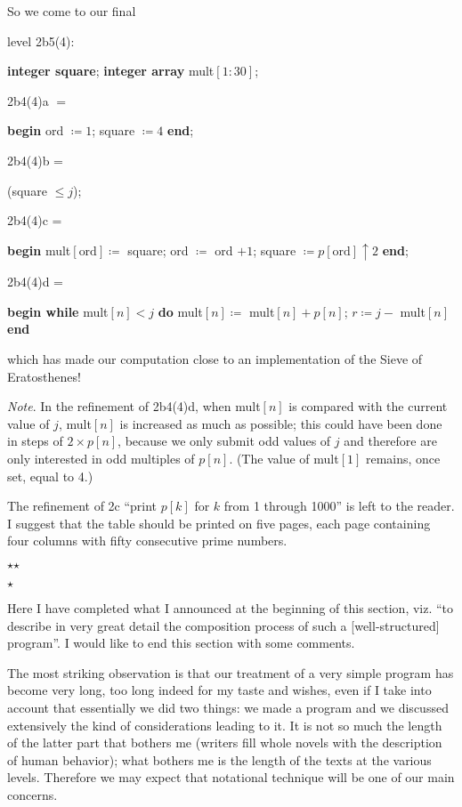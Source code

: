 So we come to our final

\noindent
level 2b5(4):

\noindent
\textbf{integer square}; \textbf{integer array} mult$[1 : 30]$;

\noindent
2b4(4)a $=$

\noindent
\textbf{begin} ord $\coloneq 1$; square $\coloneq 4$ \textbf{end};

\noindent
2b4(4)b =

\noindent
\quad (square $\leqslant j$);

\noindent
2b4(4)c =

\noindent
\textbf{begin} mult$[\text{ord}] \coloneq$ square; ord $\coloneq$ ord $ + 1$; square $\coloneq p[\text{ord}] \uparrow 2$ \textbf{end};

\noindent
2b4(4)d =

\noindent
\textbf{begin while} mult$[n] < j$ \textbf{do} mult$[n]\coloneq$ mult$[n] + p[n]$; $r\coloneq j -$ mult$[n]$ \textbf{end}

\noindent
which has made our computation close to an implementation of the Sieve of Eratosthenes!

\noindent
\textit{Note}. In the refinement of 2b4(4)d, when mult$[n]$ is compared with the current value of $j$, mult$[n]$ is increased as much as possible; this could have been done in steps of $2\times p[n]$, because we only submit odd values of $j$ and therefore are only interested in odd multiples of $p[n]$. (The value of mult$[1]$ remains, once set, equal to 4.)

The refinement of 2c ``print $p[k]$ for $k$ from 1 through 1000'' is left to the reader. I suggest that the table should be printed on five pages, each page containing four columns with fifty consecutive prime numbers.

\vspace*{-1em}
\begin{center}
	$\star$\quad\quad  $\star$\\
	\nopagebreak
	
	\vspace*{-.5em}
	$\star$
\end{center}
\vspace*{-1em}

Here I have completed what I announced at the beginning of this section, viz. ``to describe in very great detail the composition process of such a [well-structured] program''. I would like to end this section with some comments.

The most striking observation is that our treatment of a very simple program has become very long, too long indeed for my taste and wishes, even if I take into account that essentially we did two things: we made a program and we discussed extensively the kind of considerations leading to it. It is not so much the length of the latter part that bothers me (writers fill whole novels with the description of human behavior); what bothers me is the length of the texts at the various levels. Therefore we may expect that notational technique will be one of our main concerns.

